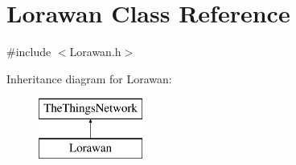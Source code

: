 \hypertarget{class_lorawan}{}\section{Lorawan Class Reference}
\label{class_lorawan}


{\ttfamily \#include $<$Lorawan.\+h$>$}

Inheritance diagram for Lorawan\+:\begin{figure}[H]
\begin{center}
\leavevmode
\includegraphics[height=2.000000cm]{class_lorawan}
\end{center}
\end{figure}
